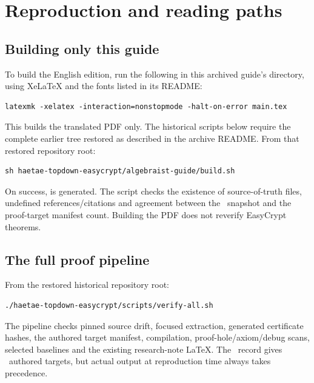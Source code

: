 \section{Reproduction and reading paths}
\label{sec:reproduction}

\subsection{Building only this guide}

To build the English edition, run the following in this archived guide's
directory, using XeLaTeX and the fonts listed in its README:
\begin{verbatim}
latexmk -xelatex -interaction=nonstopmode -halt-on-error main.tex
\end{verbatim}
This builds the translated PDF only. The historical scripts below require
the complete earlier tree restored as described in the archive README.
From that restored repository root:
\begin{verbatim}
sh haetae-topdown-easycrypt/algebraist-guide/build.sh
\end{verbatim}
On success,  is
generated. The script checks the existence of source-of-truth files, undefined
references/citations and agreement between the \AuthoredTargetCount\ snapshot
and the proof-target manifest count. Building the PDF does not reverify
EasyCrypt theorems.

\subsection{The full proof pipeline}

From the restored historical repository root:
\begin{verbatim}
./haetae-topdown-easycrypt/scripts/verify-all.sh
\end{verbatim}
The pipeline checks pinned source drift, focused extraction, generated
certificate hashes, the authored target manifest, 
compilation, proof-hole/axiom/debug scans, selected baselines and the existing
research-note LaTeX. The \SnapshotWeek\ record gives \AuthoredTargetCount\
authored targets, but actual output at reproduction time always takes precedence.

